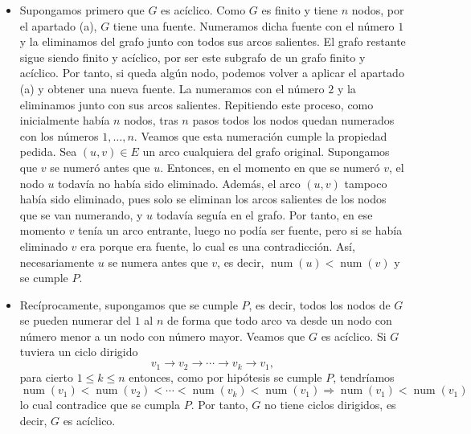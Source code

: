 \begin{ejercicio}
\begin{enumerate}
            \begin{itemize}
                \item[$\Longrightarrow)$] Supongamos primero que $G$ es acíclico. Como $G$ es finito y tiene $n$ nodos, por el apartado (a), $G$ tiene una fuente. Numeramos dicha fuente con el número $1$ y la eliminamos del grafo junto con todos sus arcos salientes.
                    El grafo restante sigue siendo finito y acíclico, por ser este subgrafo de un grafo finito y acíclico. Por tanto, si queda algún nodo, podemos volver a aplicar el apartado (a) y obtener una nueva fuente. La numeramos con el número $2$ y la eliminamos junto con sus arcos salientes.
                    Repitiendo este proceso, como inicialmente había $n$ nodos, tras $n$ pasos todos los nodos quedan numerados con los números $1,\dots,n$. Veamos que esta numeración cumple la propiedad pedida. 
                    Sea $(u,v)\in E$ un arco cualquiera del grafo original. Supongamos que $v$ se numeró antes que $u$. Entonces, en el momento en que se numeró $v$, el nodo $u$ todavía no había sido eliminado. Además, el arco $(u,v)$ tampoco había sido eliminado, pues solo 
                    se eliminan los arcos salientes de los nodos que se van numerando, y $u$ todavía seguía en el grafo. Por tanto, en ese momento $v$ tenía un arco entrante, luego no podía ser fuente, pero si se había eliminado $v$ era porque era fuente, lo cual es una contradicción. 
                    Así, necesariamente $u$ se numera antes que $v$, es decir, $\operatorname{num}(u)<\operatorname{num}(v)$ y se cumple $P$.
                \item[$(\Longleftarrow$] Recíprocamente, supongamos que se cumple $P$, es decir, todos los nodos de $G$ se pueden numerar del $1$ al $n$ de forma que todo arco va desde un nodo con número menor a un nodo con número mayor. Veamos que $G$ es acíclico.
                    Si $G$ tuviera un ciclo dirigido
                    $$
                    v_1\to v_2\to \cdots \to v_k\to v_1,
                    $$
                    para cierto $1 \leq k \leq n$ entonces, como por hipótesis se cumple $P$, tendríamos
                    $$
                    \operatorname{num}(v_1)<\operatorname{num}(v_2)<\cdots<\operatorname{num}(v_k)<\operatorname{num}(v_1) \Longrightarrow \operatorname{num}(v_1) < \operatorname{num}(v_1) 
                    $$
                    lo cual contradice que se cumpla $P$. Por tanto, $G$ no tiene ciclos dirigidos, es decir, $G$ es acíclico.
            \end{itemize}


\end{enumerate}
\end{ejercicio}

